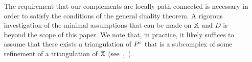 The requirement that our complements are locally path connected is necessary in order to satisfy the conditions of the general duality theorem.
A rigorous investigation of the minimal assumptions that can be made on $\mathbb{X}$ and $D$ is beyond the scope of this paper.
We note that, in practice, it likely suffices to assume that there exists a triangulation of $P^\varepsilon$ that is a subcomplex of some refinement of a triangulation of $\mathbb{X}$ (see~\cite{cavanna2017when},~\cite{julian83alexander}).
